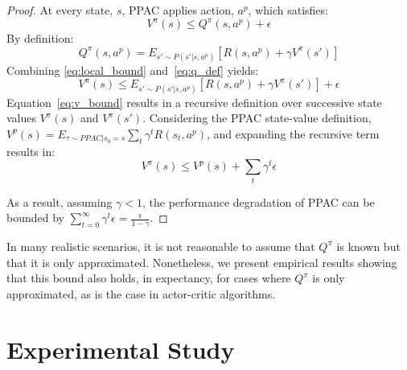 \documentclass{article}
\newcommand{\JC}[1] {{\color{blue} \textbf{[JC]: #1}}}
\begin{document}
            \begin{proof}
                At every state, $s$, PPAC applies action, $a^p$, which satisfies: 
                \begin{equation}\label{eq:local_bound}
                    V^\pi(s) \le Q^\pi(s,a^p) + \epsilon 
                \end{equation}
                By definition: 
                \begin{equation}\label{eq:q_def}
                    Q^\pi(s,a^p)=E_{s'\sim P(s'|s,a^p)}\left[R(s,a^p)+\gamma V^\pi(s')\right] 
                \end{equation}
                Combining \ref{eq:local_bound} and~\ref{eq:q_def} yields:
                \begin{equation}\label{eq:v_bound}
                    V^\pi(s) \le E_{s'\sim P(s'|s,a^p)}\left[R(s,a^p)+\gamma V^\pi(s')\right] + \epsilon
                \end{equation}
                Equation~\ref{eq:v_bound} results in a recursive definition over successive state values $V^\pi(s)$ and $V^\pi(s')$. Considering the PPAC state-value definition, $V^p(s)=E_{\tau \sim PPAC|s_0 = s}\sum_t \gamma^t R(s_t,a^p)$, and expanding the recursive term results in:
                \begin{equation}\label{eq:global_bound}
                    V^\pi(s) \le V^p(s) + \sum_t \gamma^t \epsilon
                \end{equation}
                
                As a result, assuming $\gamma < 1$, the performance degradation of PPAC can be bounded by $\sum_{t=0}^\infty \gamma^t \epsilon = \frac{\epsilon}{1-\gamma}$.
            \end{proof}

            In many realistic scenarios, it is not reasonable to assume that $Q^\pi$ is known but that it is only approximated. Nonetheless, we present empirical results showing that this bound also holds, in expectancy, for cases where $Q^\pi$ is only approximated, as is the case in actor-critic algorithms. 

    \section{Experimental Study} 

\end{document}
